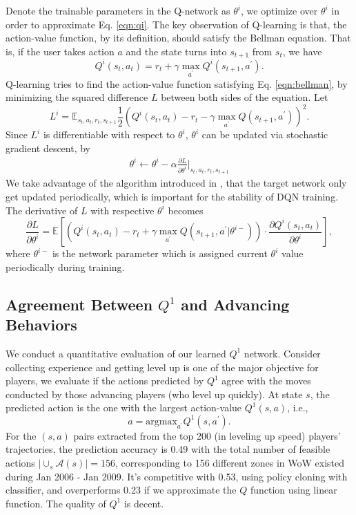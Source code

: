 \documentclass{sigchi}
\begin{document}
Denote the trainable parameters in the Q-network as $\theta^i$, we optimize over $\theta^i$ in order to approximate Eq. \eqref{eqn:qi}. The key observation of Q-learning is that, the action-value function, by its definition, should satisfy the Bellman equation. That is, if the user takes action $a$ and the state turns into $s_{t+1}$ from $s_t$, we have
\begin{equation}
Q^i(s_t,a_t)=r_{t} + \gamma \max_{a^\prime}Q^i(s_{t+1}, a^\prime). \label{eqn:bellman}
\end{equation}
Q-learning tries to find the action-value function satisfying Eq. \eqref{eqn:bellman}, by minimizing the squared difference $L$ between both sides of the equation. Let
\begin{equation*}
L^i=\mathbb{E}_{s_t, a_t, r_t, s_{t+1}} \frac{1}{2}(Q^i(s_t,a_t)- r_{t} - \gamma\max_{a^\prime}Q(s_{t+1}, a^\prime))^2.
\end{equation*}
Since $L^i$ is differentiable with respect to $\theta^i$, $\theta^i$ can be updated via stochastic gradient descent, by
\begin{eqnarray*}
\theta^i \leftarrow \theta^i - \alpha\frac{\partial L}{\partial \theta^i}\Big|_{s_t, a_t, r_t, s_{t+1}}
\end{eqnarray*}
We take advantage of the algorithm introduced in \cite{}, that the target network only get updated periodically, which is important for the stability of DQN training. The derivative of $L$ with respective $\theta^i$ becomes
$$\frac{\partial L}{\partial \theta^i} = \mathbb{E}\left[ (Q^i(s_t,a_t)- r_{t} + \gamma\max_{a^\prime}Q(s_{t+1}, a^\prime | \theta^{i -}))\cdot \frac{\partial{Q^i(s_t,a_t)}}{\partial{\theta^i}}\right],$$
where $\theta^{i-}$ is the network parameter which is assigned current $\theta^i$ value periodically during training.

\subsection{Agreement Between $Q^1$ and Advancing Behaviors}

We conduct a quantitative evaluation of our learned $Q^1$ network. Consider collecting experience and getting level up is one of the major objective for players, we evaluate if the actions predicted by $Q^1$ agree with the moves conducted by those advancing players (who level up quickly). At state $s$, the predicted action is the one with the largest action-value $Q^1(s,a)$, i.e.,
\begin{equation*}
a = \text{argmax}_{a^\prime}Q^1(s,a^\prime).
\end{equation*}
For the $(s,a)$ pairs extracted from the top 200 (in leveling up speed) players' trajectories, the prediction accuracy is 0.49 with the total number of feasible actions $|\cup_s\mathcal{A}(s)|=156$, corresponding to 156 different zones in WoW existed during Jan 2006 - Jan 2009. It's competitive with 0.53, using policy cloning \cite{amit2002parametric,sammut1992learning} with classifier, and overperforms 0.23 if we approximate the $Q$ function using linear function. The quality of $Q^1$ is decent.
\end{document}
